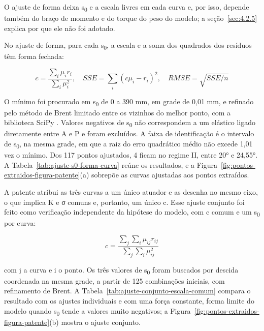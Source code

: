O ajuste de forma deixa s\textsubscript{0} e a escala livres em cada curva e, por isso, depende também do braço de momento e do torque do peso do modelo; a seção~\ref{sec:4.2.5} explica por que ele não foi adotado.

No ajuste de forma, para cada s\textsubscript{0}, a escala e a soma dos quadrados dos resíduos têm forma fechada:

\begin{equation}
  c = \frac{\sum_{i}^{}\mu_{i}r_{i}}{\sum_{i}^{}\mu_{i}^{2}},\quad SSE = \sum_{i}^{}{(c\mu_{i} - r_{i})}^{2},\quad RMSE = \sqrt{SSE/n}
  \label{eq:68}
\end{equation}

O mínimo foi procurado em s\textsubscript{0} de 0 a 390 mm, em grade de 0,01 mm, e refinado pelo método de Brent limitado \cite{brent1973} entre os vizinhos do melhor ponto, com a biblioteca SciPy \cite{virtanen2020}. Valores negativos de s\textsubscript{0} não correspondem a um elástico ligado diretamente entre A e P e foram excluídos. A faixa de identificação é o intervalo de s\textsubscript{0}, na mesma grade, em que a raiz do erro quadrático médio não excede 1,01 vez o mínimo. Dos 117 pontos ajustados, 4 ficam no regime II, entre 20° e 24,55°. A Tabela~\ref{tab:ajuste-s0-forma-curva} reúne os resultados, e a Figura~\ref{fig:pontos-extraidos-figura-patente}(a) sobrepõe as curvas ajustadas aos pontos extraídos.

A patente atribui as três curvas a um único atuador e as desenha no mesmo eixo, o que implica K e σ comuns e, portanto, um único c. Esse ajuste conjunto foi feito como verificação independente da hipótese do modelo, com c comum e um s\textsubscript{0} por curva:

\begin{equation}
  c = \frac{\sum_{j}^{}{\sum_{i}^{}\mu_{ij}}r_{ij}}{\sum_{j}^{}{\sum_{i}^{}\mu_{ij}^{2}}}
  \label{eq:69}
\end{equation}

com j a curva e i o ponto. Os três valores de s\textsubscript{0} foram buscados por descida coordenada na mesma grade, a partir de 125 combinações iniciais, com refinamento de Brent. A Tabela~\ref{tab:ajuste-conjunto-escala-comum} compara o resultado com os ajustes individuais e com uma força constante, forma limite do modelo quando s\textsubscript{0} tende a valores muito negativos; a Figura~\ref{fig:pontos-extraidos-figura-patente}(b) mostra o ajuste conjunto.

